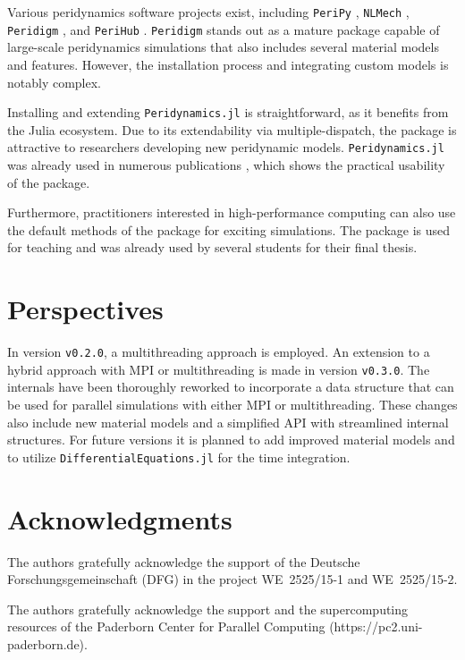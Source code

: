 \documentclass{juliacon}
\begin{document}
Various peridynamics software projects exist, including \texttt{PeriPy} \cite{PeriPy2021}, \texttt{NLMech} \cite{Jha2021}, \texttt{Peridigm} \cite{Peridigm2024}, and \texttt{PeriHub} \cite{Willberg2023}.
\texttt{Peridigm} stands out as a mature package capable of large-scale peridynamics simulations that also 
includes several material models and features.
However, the installation process and integrating custom models is notably complex.

Installing and extending \texttt{Peridynamics.jl} is straightforward, as it benefits from the Julia ecosystem.
Due to its extendability via multiple-dispatch, the package is attractive to researchers developing new peridynamic models.
\texttt{Peridynamics.jl} was already used in numerous publications \cite{Friebertshaeuser2022PAMM,Friebertshaeuser2022AIMS,Partmann2023IJF,Partmann2024AAM,Partmann2024PAMM,Tornquist2022PAMM}, which shows the practical usability of the package.

Furthermore, practitioners interested in high-performance computing can also use the default methods of the package for exciting simulations.
The package is used for teaching and was already used by several students for their final thesis.

\section{Perspectives}
In version \texttt{v0.2.0}, a multithreading approach is employed.
An extension to a hybrid approach with MPI or multithreading is made in version \texttt{v0.3.0}.
The internals have been thoroughly reworked to incorporate a data structure that can be used for parallel simulations with either MPI or multithreading.
These changes also include new material models and a simplified API with streamlined internal structures.
For future versions it is planned to add improved material models and to utilize \texttt{DifferentialEquations.jl} for the time integration.

\section{Acknowledgments}
The authors gratefully acknowledge the support of the Deutsche Forschungsgemeinschaft (DFG) in the project \mbox{WE~2525/15-1} and \mbox{WE~2525/15-2}.

The authors gratefully acknowledge the support and the supercomputing resources of the Paderborn Center for Parallel Computing (https://pc2.uni-paderborn.de).



\end{document}
